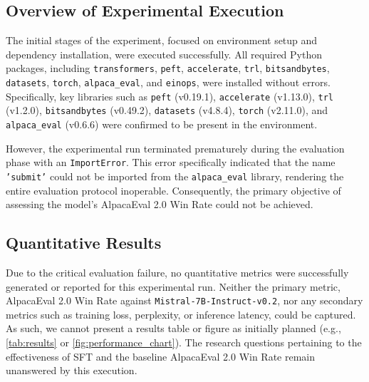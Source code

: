 \documentclass[11pt]{article}
\begin{document}
\subsection{Overview of Experimental Execution}
The initial stages of the experiment, focused on environment setup and dependency installation, were executed successfully. All required Python packages, including \texttt{transformers}, \texttt{peft}, \texttt{accelerate}, \texttt{trl}, \texttt{bitsandbytes}, \texttt{datasets}, \texttt{torch}, \texttt{alpaca\_eval}, and \texttt{einops}, were installed without errors. Specifically, key libraries such as \texttt{peft} (v0.19.1), \texttt{accelerate} (v1.13.0), \texttt{trl} (v1.2.0), \texttt{bitsandbytes} (v0.49.2), \texttt{datasets} (v4.8.4), \texttt{torch} (v2.11.0), and \texttt{alpaca\_eval} (v0.6.6) were confirmed to be present in the environment.

However, the experimental run terminated prematurely during the evaluation phase with an \texttt{ImportError}. This error specifically indicated that the name \texttt{'submit'} could not be imported from the \texttt{alpaca\_eval} library, rendering the entire evaluation protocol inoperable. Consequently, the primary objective of assessing the model's AlpacaEval 2.0 Win Rate could not be achieved.

\subsection{Quantitative Results}
Due to the critical evaluation failure, no quantitative metrics were successfully generated or reported for this experimental run. Neither the primary metric, AlpacaEval 2.0 Win Rate against \texttt{Mistral-7B-Instruct-v0.2}, nor any secondary metrics such as training loss, perplexity, or inference latency, could be captured. As such, we cannot present a results table or figure as initially planned (e.g., \ref{tab:results} or \ref{fig:performance_chart}). The research questions pertaining to the effectiveness of SFT and the baseline AlpacaEval 2.0 Win Rate remain unanswered by this execution.
\end{document}

